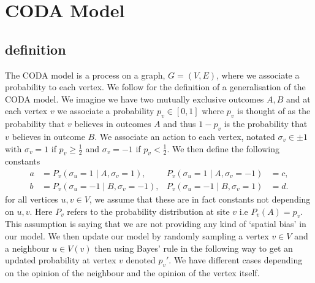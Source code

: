 \chapter{CODA Model}\label{sec:coda}

\section{definition}
The CODA model \cite{MARTINS_2008} is a process on a graph, \(G=(V,E)\), where we associate a probability to each vertex.
We follow \cite{martins2010} for the definition of a generalisation of the CODA model.
We imagine we have two mutually exclusive outcomes \(A,B\) and at each vertex \(v\) we associate a probability \(p_v\in[0,1]\) where \(p_v\) is thought of as the probability that \(v\) believes in outcomes \(A\) and thus \(1-p_v\) is the probability that \(v\) believes in outcome \(B\).
We associate an action to each vertex, notated \(\sigma_{v}\in\pm 1\) with \(\sigma_{v}=1\) if \(p_v\ge \frac{1}{2}\) and \(\sigma_v=-1\) if \(p_v<\frac{1}{2}\).
We then define the following constants
\be
\begin{align*}
	a &= P_v(\sigma_u=1\mid A,\sigma_v=1),& P_v(\sigma_u=1\mid A,\sigma_v=-1) & = c,\\
	b &= P_v(\sigma_u=-1\mid B,\sigma_v=-1),& P_v(\sigma_u=-1\mid B,\sigma_v=1)& = d.
\end{align*}
\ee
for all vertices \(u,v\in V\), we assume that these are in fact constants not depending on \(u,v\).
Here \(P_v\) refers to the probability distribution at site \(v\) i.e \(P_v(A)=p_v\).
This assumption is saying that we are not providing any kind of `spatial bias' in our model.
We then update our model by randomly sampling a vertex \(v\in V\) and a neighbour \(u\in V(v)\) then using Bayes' rule in the following way to get an updated probability at vertex \(v\) denoted \(p_v'\).
We have different cases depending on the opinion of the neighbour and the opinion of the vertex itself.

